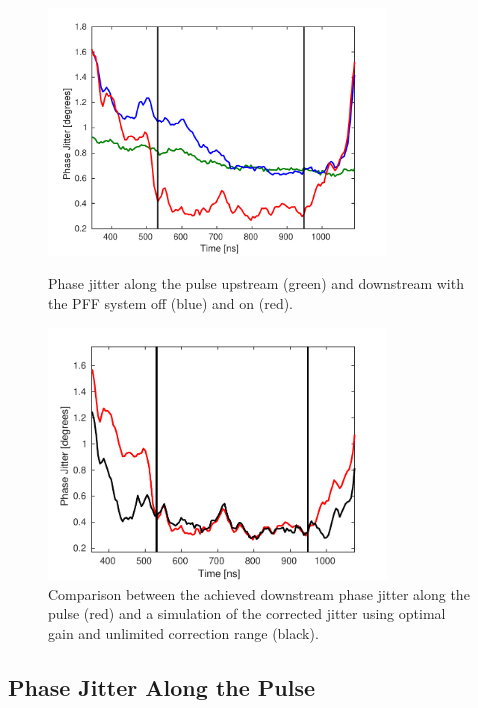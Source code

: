 \begin{figure}
  \centering
  \includegraphics[width=0.8\textwidth]{Figures/feedforward/BestFF_StdPhaseAlong}
  \caption{Phase jitter along the pulse upstream (green) and downstream with the PFF system off (blue) and on (red).}
  \label{f:BestFF_StdPhaseAlong}

  \includegraphics[width=0.8\textwidth]{Figures/feedforward/BestFF_SimStdAlongPulse}
  \caption{Comparison between the achieved downstream phase jitter along the pulse (red) and a simulation of the corrected jitter using optimal gain and unlimited correction range (black).}
  \label{f:BestFF_SimStdPhaseAlong}
\end{figure}



\subsection{Phase Jitter Along the Pulse}
\label{ss:bestJitterAlong}

